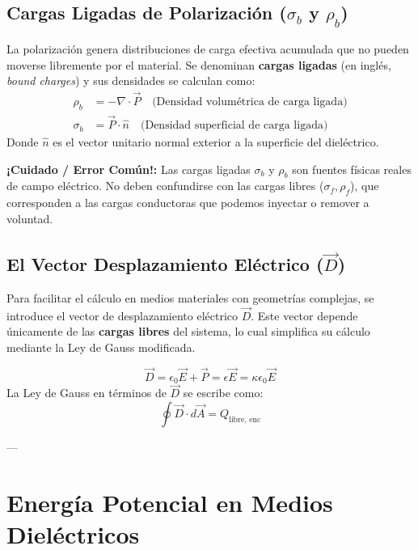 \documentclass[12pt, a4paper]{article}
\newcommand{\alerta}[1]{\begin{alertabox}\textbf{¡Cuidado / Error Común!:} #1\end{alertabox}}
\begin{document}
\subsection{Cargas Ligadas de Polarización ($\sigma_b$ y $\rho_b$)}
La polarización genera distribuciones de carga efectiva acumulada que no pueden moverse libremente por el material. Se denominan \textbf{cargas ligadas} (en inglés, \textit{bound charges}) y sus densidades se calculan como:
\begin{align}
    \rho_b &= -\nabla \cdot \vec{P} \quad \text{(Densidad volumétrica de carga ligada)} \\
    \sigma_b &= \vec{P} \cdot \hat{n} \quad \text{(Densidad superficial de carga ligada)}
\end{align}
Donde $\hat{n}$ es el vector unitario normal exterior a la superficie del dieléctrico.

\alerta{Las cargas ligadas $\sigma_b$ y $\rho_b$ son fuentes físicas reales de campo eléctrico. No deben confundirse con las cargas libres ($\sigma_f, \rho_f$), que corresponden a las cargas conductoras que podemos inyectar o remover a voluntad.}

\subsection{El Vector Desplazamiento Eléctrico ($\vec{D}$)}
Para facilitar el cálculo en medios materiales con geometrías complejas, se introduce el vector de desplazamiento eléctrico $\vec{D}$. Este vector depende únicamente de las \textbf{cargas libres} del sistema, lo cual simplifica su cálculo mediante la Ley de Gauss modificada.
\begin{definicion}
\begin{equation}
    \vec{D} = \epsilon_0 \vec{E} + \vec{P} = \epsilon \vec{E} = \kappa \epsilon_0 \vec{E}
\end{equation}
La Ley de Gauss en términos de $\vec{D}$ se escribe como:
\begin{equation}
    \oint \vec{D} \cdot d\vec{A} = Q_{\text{libre, enc}}
\end{equation}
\end{definicion}

---

\section{Energía Potencial en Medios Dieléctricos}
\end{document}

